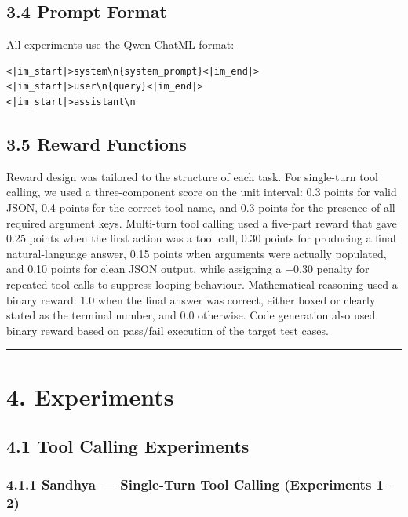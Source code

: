 \documentclass[
  american,
  11pt,
  a4paper,
  oneside]{report}
\begin{document}
\section{3.4 Prompt Format}\label{prompt-format}

All experiments use the Qwen ChatML format:

\begin{verbatim}
<|im_start|>system\n{system_prompt}<|im_end|>
<|im_start|>user\n{query}<|im_end|>
<|im_start|>assistant\n
\end{verbatim}

\section{3.5 Reward Functions}\label{reward-functions}

Reward design was tailored to the structure of each task. For
single-turn tool calling, we used a three-component score on the unit
interval: 0.3 points for valid JSON, 0.4 points for the correct tool
name, and 0.3 points for the presence of all required argument keys.
Multi-turn tool calling used a five-part reward that gave 0.25 points
when the first action was a tool call, 0.30 points for producing a final
natural-language answer, 0.15 points when arguments were actually
populated, and 0.10 points for clean JSON output, while assigning a
−0.30 penalty for repeated tool calls to suppress looping behaviour.
Mathematical reasoning used a binary reward: 1.0 when the final answer
was correct, either boxed or clearly stated as the terminal number, and
0.0 otherwise. Code generation also used binary reward based on
pass/fail execution of the target test cases.

\begin{center}\rule{0.5\linewidth}{0.5pt}\end{center}

\chapter{4. Experiments}\label{experiments}

\section{4.1 Tool Calling Experiments}\label{tool-calling-experiments}

\subsection{4.1.1 Sandhya --- Single-Turn Tool Calling (Experiments
1--2)}\label{sandhya-single-turn-tool-calling-experiments-12}
\end{document}
